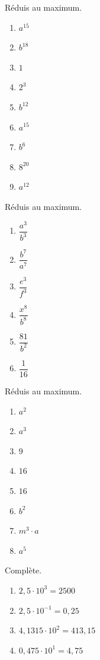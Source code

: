 \documentclass[12pt,parskip=half-, twoside=semi]{scrartcl}
\begin{document}
\begin{exercise}
  Réduis au maximum.
  \begin{enumerate}[cols=6]
\item \(a^{15} \)
\item \(b^{18} \)
\item \(1 \)
\item \(2^{3} \)
\item \(b^{12} \)
\item \(a^{15} \)
\item \(b^{6} \)
\item \(8^{20} \)
\item \(a^{12} \)
  \end{enumerate}
\end{exercise}

\begin{exercise}
  Réduis au maximum.
  \begin{enumerate}[cols=6]
    \item \(\dfrac{a^{3}}{b^{3}}\)
    \item \(\dfrac{b^{7}}{a^{7}}\)
    \item \(\dfrac{e^{3}}{f^{3}}\)
    \item \(\dfrac{x^{8} }{b^{8}}\)
    \item \(\dfrac{81}{b^{2}}\)
    \item \(\dfrac{1}{16}\)
  \end{enumerate}
\end{exercise}

\begin{exercise}
  Réduis au maximum.
  \begin{enumerate}[cols=4]
    \item \(a^2 \)
    \item \(a^3 \)
    \item \(9 \)
    \item \(16\)
    \item \(16\)
    \item \(b^2\)
    \item \(m^3\cdot a\)
    \item \(a^5\)

  \end{enumerate}
\end{exercise}

\begin{exercise}
  Complète.
  \begin{enumerate}[cols=2]
    \item \(2,5 \cdot 10^{3} = 2500\)
    \item\(2,5 \cdot 10^{-1} = 0,25\)
    \item\(4,1315 \cdot 10^{2} = 413,15\)
    \item\(0,475 \cdot 10^{1} = 4,75\)
  \end{enumerate}
\end{exercise}
\end{document}
